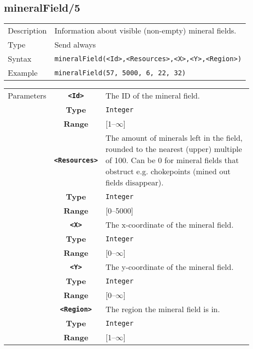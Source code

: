\subsection{mineralField/5}
\begin{tabularx}{\textwidth}{lX}
 Description & Information about visible (non-empty) mineral fields. \\
 Type & Send always \\
 Syntax & \verb|mineralField(<Id>,<Resources>,<X>,<Y>,<Region>)| \\
 Example & \verb|mineralField(57, 5000, 6, 22, 32)| \\
 \end{tabularx}
 \begin{tabularx}{\textwidth}{l | c | p{8cm}|}
 \cline{2-3}
 Parameters & \textbf{\verb|<Id>|} & The ID of the mineral field.\\
            & \textbf{Type} & \verb|Integer| \\
            & \textbf{Range} & [1--$\infty$] \\
            \cline{2-3}
            & \textbf{\verb|<Resources>|} & The amount of minerals left in the field, rounded to the nearest (upper) multiple of 100. Can be 0 for mineral fields that obstruct e.g. chokepoints (mined out fields disappear).\\
            & \textbf{Type} & \verb|Integer| \\
            & \textbf{Range} & [0--5000] \\
            \cline{2-3}
            & \textbf{\verb|<X>|} & The x-coordinate of the mineral field.\\
            & \textbf{Type} & \verb|Integer| \\
            & \textbf{Range} & [0--$\infty$] \\
            \cline{2-3}
            & \textbf{\verb|<Y>|} & The y-coordinate of the mineral field.\\
            & \textbf{Type} & \verb|Integer| \\
            & \textbf{Range} & [0--$\infty$] \\
            \cline{2-3}
            & \textbf{\verb|<Region>|} & The region the mineral field is in.\\
            & \textbf{Type} & \verb|Integer| \\
            & \textbf{Range} & [1--$\infty$] \\
            \cline{2-3}
\end{tabularx}


